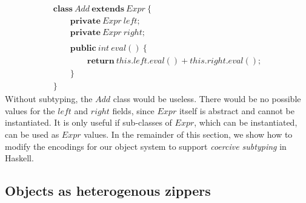 \begin{displaymath}
\begin{array}{l}
\mathbf{class}~\mathit{Add}~\mathbf{extends}~\mathit{Expr}~\{\\
\qquad \mathbf{private}~\mathit{Expr}~\mathit{left};\\
\qquad \mathbf{private}~\mathit{Expr}~\mathit{right};\\\\
\qquad \mathbf{public}~\mathit{int}~\mathit{eval}()~\{\\
\qquad \qquad \mathbf{return}~\mathit{this}.\mathit{left}.\mathit{eval}() + \mathit{this}.\mathit{right}.\mathit{eval}();\\
\qquad \}\\
\}
\end{array}
\end{displaymath}
Without subtyping, the $\mathit{Add}$ class would be useless. There would be no possible values for the $\mathit{left}$ and $\mathit{right}$ fields, since $\mathit{Expr}$ itself is abstract and cannot be instantiated. It is only useful if sub-classes of $\mathit{Expr}$, which can be instantiated, can be used as $\mathit{Expr}$ values. In the remainder of this section, we show how to modify the encodings for our object system to support \emph{coercive subtyping} in Haskell.

\subsection{Objects as heterogenous zippers}

